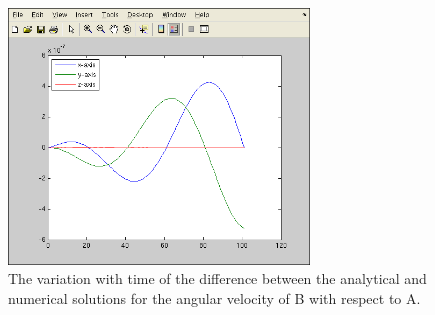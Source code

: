 \begin{description}
\begin{figure}[!ht]
  \begin{center}
        \includegraphics[width=80mm]{figures/relative7_wba.png}
        \caption{The variation with time of the difference between the analytical and numerical solutions for the angular velocity of B with respect to A.}
        \label{fig:rel7_6} 
  \end{center}
\end{figure}

\end{description}
